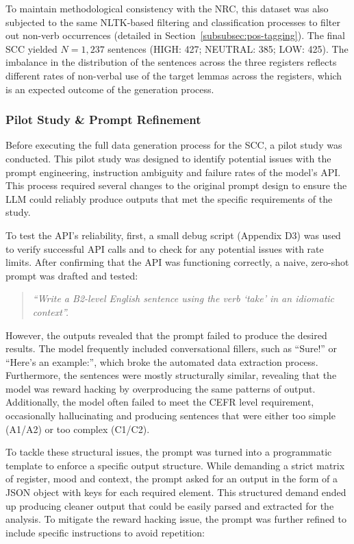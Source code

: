 \documentclass[11pt,a4paper]{article}
\begin{document}
To maintain methodological consistency with the NRC, this dataset was also subjected to the same NLTK-based filtering and classification processes to filter out non-verb occurrences (detailed in Section~\ref{subsubsec:pos-tagging}). The final SCC yielded $N=1{,}237$ sentences (HIGH: 427; NEUTRAL: 385; LOW: 425). The imbalance in the distribution of the sentences across the three registers reflects different rates of non-verbal use of the target lemmas across the registers, which is an expected outcome of the generation process. 

\subsubsection{Pilot Study \& Prompt Refinement}\label{subsubsec:pilot-study}

Before executing the full data generation process for the SCC, a pilot study was conducted. This pilot study was designed to identify potential issues with the prompt engineering, instruction ambiguity and failure rates of the model's API. This process required several changes to the original prompt design to ensure the LLM could reliably produce outputs that met the specific requirements of the study. 

To test the API's reliability, first, a small debug script (Appendix D3) was used to verify successful API calls and to check for any potential issues with rate limits. After confirming that the API was functioning correctly, a naive, zero-shot prompt was drafted and tested:

\begin{quote}\label{naive-prompt}
    \textit{``Write a B2-level English sentence using the verb `take' in an idiomatic context''.}
\end{quote}

However, the outputs revealed that the prompt failed to produce the desired results. The model frequently included conversational fillers, such as ``Sure!'' or ``Here's an example:'', which broke the automated data extraction process. Furthermore, the sentences were mostly structurally similar, revealing that the model was reward hacking by overproducing the same patterns of output. Additionally, the model often failed to meet the CEFR level requirement, occasionally hallucinating and producing sentences that were either too simple (A1/A2) or too complex (C1/C2).

To tackle these structural issues, the prompt was turned into a programmatic template to enforce a specific output structure. While demanding a strict matrix of register, mood and context, the prompt asked for an output in the form of a JSON object with keys for each required element. This structured demand ended up producing cleaner output that could be easily parsed and extracted for the analysis. To mitigate the reward hacking issue, the prompt was further refined to include specific instructions to avoid repetition:
\end{document}
